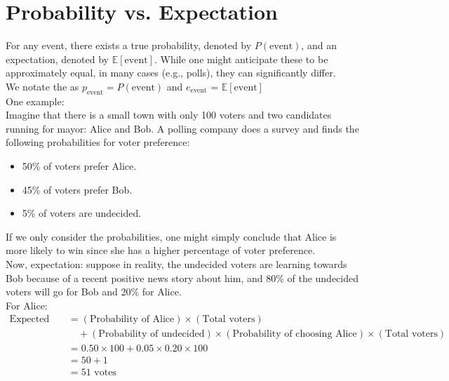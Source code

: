 \section{Probability vs. Expectation}
For any event, there exists a true probability, denoted by \( P(\text{event}) \), and an expectation, denoted by \( \mathbb{E}[\text{event}] \). While one might anticipate these to be approximately equal, in many cases (e.g., polls), they can significantly differ. \\

We notate the as $p_{\text{event}} = P(\text{event})$ and $e_{\text{event}}$ = $\mathbb{E}[\text{event}]$ \\

One example:\\

Imagine that there is a small town with only 100 voters and two candidates running for mayor: Alice and Bob. A polling company does a survey and finds the following probabilities for voter preference:

\begin{itemize}
    \item 50\% of voters prefer Alice.
    \item 45\% of voters prefer Bob.
    \item 5\% of voters are undecided.
\end{itemize}

If we only consider the probabilities, one might simply conclude that Alice is more likely to win since she has a higher percentage of voter preference.\\

Now, expectation: suppose in reality, the undecided voters are learning towards Bob because of a recent positive news story about him, and 80\% of the undecided voters will go for Bob and 20\% for Alice.\\

For Alice:
\begin{align*}
    \text{Expected votes} &= (\text{Probability of Alice}) \times (\text{Total voters}) \\
    &\quad + (\text{Probability of undecided}) \times (\text{Probability of choosing Alice}) \times (\text{Total voters}) \\
    &= 0.50 \times 100 + 0.05 \times 0.20 \times 100 \\
    &= 50 + 1 \\
    &= 51 \text{ votes}
\end{align*}

